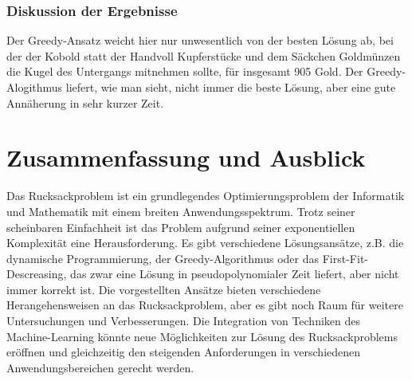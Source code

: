 \documentclass[12pt]{report}
\begin{document}
		\subsection{Diskussion der Ergebnisse}
		Der Greedy-Ansatz weicht hier nur unwesentlich von der besten Lösung ab, bei der der Kobold statt der Handvoll Kupferstücke und dem Säckchen Goldmünzen die Kugel des Untergangs mitnehmen sollte, für insgesamt 905 Gold. Der Greedy-Alogithmus liefert, wie man sieht, nicht immer die beste Lösung, aber eine gute Annäherung in sehr kurzer Zeit.

\newpage
\chapter{Zusammenfassung und Ausblick}
Das Rucksackproblem ist ein grundlegendes Optimierungsproblem der Informatik und Mathematik mit einem breiten Anwendungsspektrum. Trotz seiner scheinbaren Einfachheit ist das Problem aufgrund seiner exponentiellen Komplexität eine Herausforderung. Es gibt verschiedene Lösungsansätze, z.B. die dynamische Programmierung, der Greedy-Algorithmus oder das First-Fit-Descreasing, das zwar eine Lösung in pseudopolynomialer Zeit liefert, aber nicht immer korrekt ist. Die vorgestellten Ansätze bieten verschiedene Herangehensweisen an das Rucksackproblem, aber es gibt noch Raum für weitere Untersuchungen und Verbesserungen. Die Integration von Techniken des Machine-Learning könnte neue Möglichkeiten zur Lösung des Rucksackproblems eröffnen und gleichzeitig den steigenden Anforderungen in verschiedenen Anwendungsbereichen gerecht werden.

\newpage
{}
\setcounter{page}{\value{frontmatterPage}} %
\addtocounter{page}{1}

\renewcommand{\refname}{Literaturverzeichnis}


\end{document}
